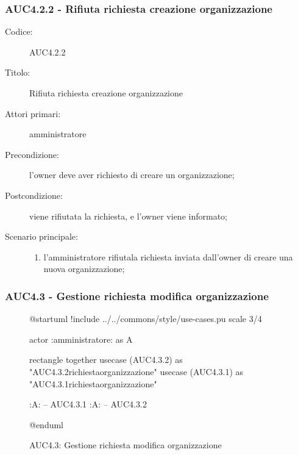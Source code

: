 \documentclass[casi-duso]{subfiles}
\begin{document}
\subsubsection{AUC4.2.2 - Rifiuta richiesta creazione organizzazione}%
\label{subsub:AUC4.2.2}
\begin{description}
  \item[Codice:] AUC4.2.2
  \item[Titolo:] Rifiuta richiesta creazione organizzazione
  \item[Attori primari:] amministratore
  \item[Precondizione:] l'owner deve aver richiesto di creare un organizzazione;
  \item[Postcondizione:] viene rifiutata la richiesta, e l'owner viene informato;
  \item[Scenario principale:]
  \begin{enumerate}
    \item  l'amministratore rifiutala richiesta inviata dall'owner di creare una nuova organizzazione;
  \end{enumerate}
\end{description}

\subsubsection{AUC4.3 - Gestione richiesta modifica organizzazione}%
\label{subsub:AUC4.3}

\begin{figure}[h!] 
  \centering 
  \begin{plantuml}
  @startuml
  !include ../../commons/style/use-cases.pu
  scale 3/4

  actor :amministratore: as A

  rectangle {
    together {
      usecase (AUC4.3.2) as "AUC4.3.2\nRifiuta richiesta\nmodifica organizzazione"
      usecase (AUC4.3.1) as "AUC4.3.1\nAccetta richiesta\nmodifica organizzazione"
    }
  }

  :A: -- AUC4.3.1
  :A: -- AUC4.3.2

  @enduml
  \end{plantuml} 
  \caption{AUC4.3: Gestione richiesta modifica organizzazione} 
  \label{fig:auc4_3} 
\end{figure}
\end{document}

